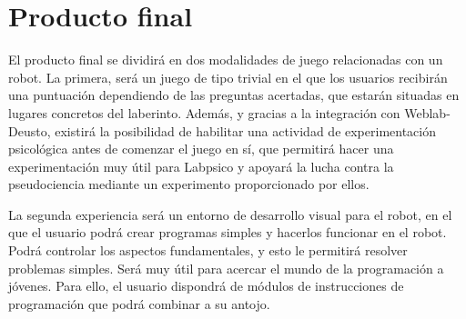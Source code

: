 \chapter{Producto final}

El producto final se dividirá en dos modalidades de juego relacionadas con un robot. La primera,
será un juego de tipo trivial en el que los usuarios recibirán una puntuación dependiendo de las
preguntas acertadas, que estarán situadas en lugares concretos del laberinto. Además, y gracias a la
integración con Weblab-Deusto, existirá la posibilidad de habilitar una actividad de experimentación
psicológica antes de comenzar el juego en sí, que permitirá hacer una experimentación muy útil para
Labpsico y apoyará la lucha contra la pseudociencia mediante un experimento proporcionado por ellos.

La segunda experiencia será un entorno de desarrollo visual para el robot, en el que el usuario
podrá crear programas simples y hacerlos funcionar en el robot. Podrá controlar los aspectos
fundamentales, y esto le permitirá resolver problemas simples. Será muy útil para acercar el mundo
de la programación a jóvenes. Para ello, el usuario dispondrá de módulos de instrucciones de
programación que podrá combinar a su antojo.
